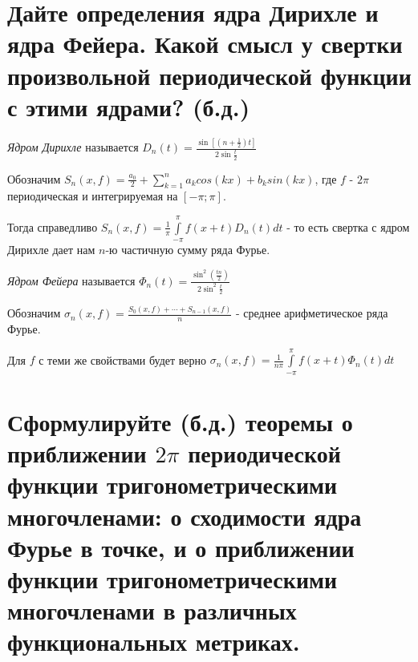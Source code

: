 \documentclass{article}
\begin{document}
	\section{Дайте определения ядра Дирихле и ядра Фейера. Какой смысл у свертки произвольной периодической функции с этими ядрами? (б.д.)}
	
	\begin{definition}
		\textit{Ядром Дирихле} называется $D_n(t)=\frac{\sin[(n+\frac{1}{2})t]}{2\sin{\frac{t}{2}}}$
	\end{definition}

	Обозначим $S_n(x,f)=\frac{a_0}{2} + \sum_{k=1}^{n} a_k cos(kx) + b_k sin(kx)$, где $f$ - $2\pi$ периодическая и интегрируемая на $[-\pi; \pi]$. 
	
	Тогда справедливо $S_n(x, f)=\frac{1}{\pi}\int\limits_{-\pi}^{\pi}f(x+t)D_n(t) dt$ - то есть свертка с ядром Дирихле дает нам $n$-ю частичную сумму ряда Фурье.

	\begin{definition}
		\textit{Ядром Фейера} называется $\Phi_n(t)=\frac{\sin^2(\frac{tn}{2})}{2\sin^2{\frac{t}{2}}}$
	\end{definition}

	Обозначим $\sigma_n(x,f)=\frac{S_0(x, f)+\cdots+S_{n-1}(x, f)}{n}$ - среднее арифметическое ряда Фурье. 
	
	Для $f$ с теми же свойствами будет верно $\sigma_n(x, f)=\frac{1}{n\pi}\int\limits_{-\pi}^{\pi}f(x+t)\Phi_n(t) dt$
	 
	\section{Сформулируйте (б.д.) теоремы о приближении $2\pi$ периодической функции тригонометрическими многочленами: о сходимости ядра Фурье в точке, и о приближении функции тригонометрическими многочленами в различных функциональных метриках.} 
\end{document}
